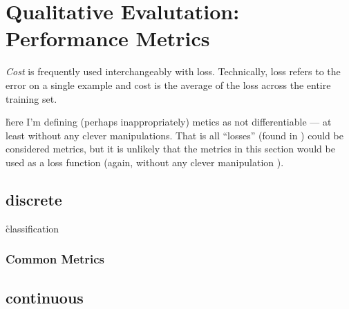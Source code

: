 \section{Qualitative Evalutation: Performance Metrics}



\emph{Cost} is frequently used interchangeably with loss. Technically, loss refers to the error on a single example and cost is the average of the loss across the entire training set.


\r{here I'm defining (perhaps inappropriately) metics as not differentiable --- at least without any clever manipulations.  That is all ``losses'' (found in ) could be considered metrics, but it is unlikely that the metrics in this section would be used as a loss function (again, without any clever manipulation ).}




\subsection{discrete}

\r{classification}


\subsubsection{Common Metrics}




\subsection{continuous}


